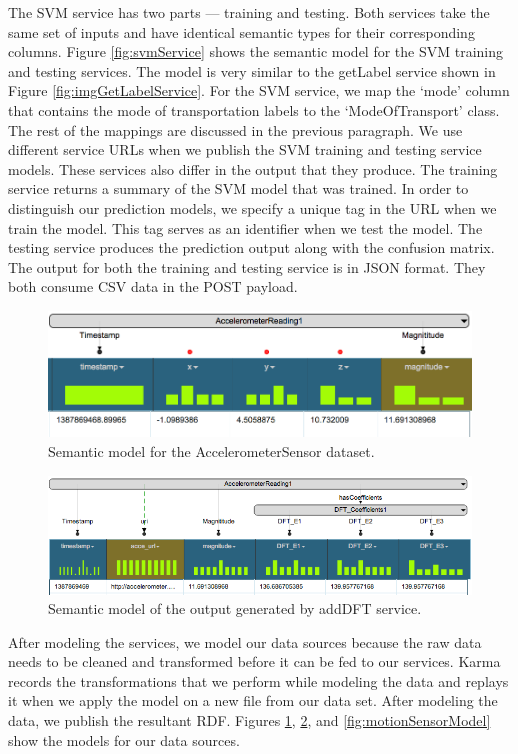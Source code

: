The SVM service has two parts --- training and testing. Both  services take the same set of inputs and have identical semantic types for their corresponding columns. Figure \ref{fig:svmService} shows the semantic model for the SVM training and testing services. The model is very similar to the getLabel service shown in  Figure \ref{fig:imgGetLabelService}. For the SVM service, we map the `mode' column that contains the mode of transportation labels to the `ModeOfTransport' class. The rest of the mappings are discussed in the previous paragraph. We use different service URLs when we publish the SVM training and testing service models. These services also differ in the output that they produce. The training service returns a summary of the SVM model that was trained. In order to distinguish our prediction models, we specify a unique tag in the URL when we train the model. This tag serves as an identifier when we test the model. The testing service produces the prediction output along with the confusion matrix. The output for both the training and testing service is in JSON format. They both consume CSV data in the POST payload.

\begin{figure}[ht!]
\centering
\includegraphics[width=117mm]{img/AccelerometerReadingModel}
\caption{Semantic model for the AccelerometerSensor dataset.\label{fig:AccelerometerReadingModel}}
\end{figure}

\begin{figure}[b]
\centering
\includegraphics[width=177mm]{img/DFToutput}
\caption{Semantic model of the output generated by addDFT service. \label{fig:DFToutput}}
\end{figure}

After modeling the services, we model our data sources because the raw data needs to be cleaned and transformed before it can be fed to our services. Karma records the transformations that we perform while modeling the data and replays it when we apply the model on a new file from our data set. After modeling the data, we publish the resultant RDF. Figures \ref{fig:AccelerometerReadingModel}, \ref{fig:DFToutput}, and \ref{fig:motionSensorModel} show the models for our data sources.

